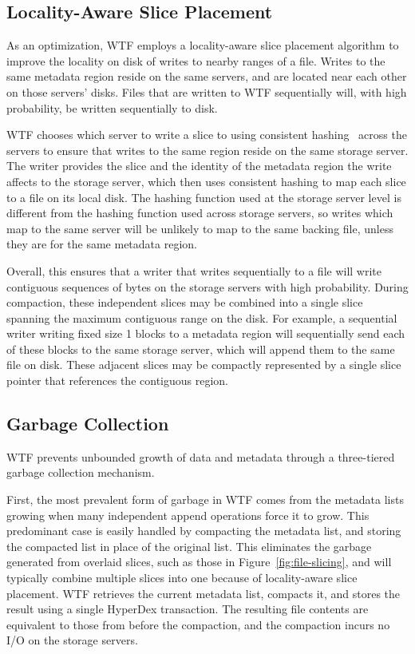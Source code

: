 \documentclass[twocolumn,10pt,letterpaper]{article}
\begin{document}
\subsection{Locality-Aware Slice Placement}
\label{sec:locality}

As an optimization, WTF employs a locality-aware slice placement algorithm to
improve the locality on disk of writes to nearby ranges of a file.  Writes to
the same metadata region reside on the same servers, and are located near each
other on those servers' disks.  Files that are written to WTF sequentially will,
with high probability, be written sequentially to disk.

WTF chooses which server to write a slice to using consistent
hashing~\cite{consist-hash} across the servers to ensure that writes to the same
region reside on the same storage server.  The writer provides the slice and the
identity of the metadata region the write affects to the storage server, which
then uses consistent hashing to map each slice to a file on its local disk.  The
hashing function used at the storage server level is different from the hashing
function used across storage servers, so writes which map to the same server
will be unlikely to map to the same backing file, unless they are for the same
metadata region.

Overall, this ensures that a writer that writes sequentially to a file will
write contiguous sequences of bytes on the storage servers with high
probability.  During compaction, these independent slices may be combined into a
single slice spanning the maximum contiguous range on the disk.  For example, a
sequential writer writing fixed size \unit{1}{\mega\byte} blocks to a metadata
region will sequentially send each of these blocks to the same storage server,
which will append them to the same file on disk.  These adjacent slices may be
compactly represented by a single slice pointer that references the contiguous
region.

\subsection{Garbage Collection}
\label{sec:gc}

WTF prevents unbounded growth of data and metadata through a three-tiered garbage collection
mechanism.  


First, the most prevalent form of garbage in WTF comes from the metadata lists growing
when many independent append operations force it to grow.  This predominant case
is easily handled by compacting the metadata list, and storing the compacted
list in place of the original list.  This eliminates the garbage generated from
overlaid slices, such as those in Figure~\ref{fig:file-slicing}, and will
typically combine multiple slices into one because of locality-aware slice placement.  WTF
retrieves the current metadata list, compacts it, and stores the result using a
single HyperDex transaction.  The resulting file contents are equivalent to
those from before the compaction, and the compaction incurs no I/O on the
storage servers.
\end{document}
